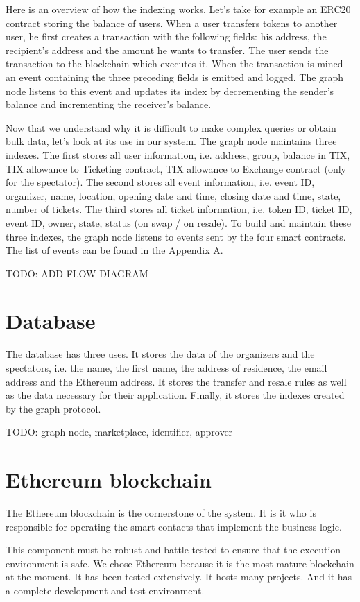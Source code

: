 \documentclass[a4paper,11pt,oneside]{report}
\begin{document}
Here is an overview of how the indexing works. Let's take for example an ERC20 contract storing the balance of users. When a user transfers tokens to another user, he first creates a transaction with the following fields: his address, the recipient's address and the amount he wants to transfer. The user sends the transaction to the blockchain which executes it. When the transaction is mined an event containing the three preceding fields is emitted and logged. The graph node listens to this event and updates its index by decrementing the sender's balance and incrementing the receiver's balance.

Now that we understand why it is difficult to make complex queries or obtain bulk data, let's look at its use in our system. The graph node maintains three indexes. The first stores all user information, i.e. address, group, balance in TIX, TIX allowance to Ticketing contract, TIX allowance to Exchange contract (only for the spectator). The second stores all event information, i.e. event ID, organizer, name, location, opening date and time, closing date and time, state, number of tickets. The third stores all ticket information, i.e. token ID, ticket ID, event ID, owner, state, status (on swap / on resale). To build and maintain these three indexes, the graph node listens to events sent by the four smart contracts. The list of events can be found in the \hyperref[sec:appendix_a]{Appendix A}.

TODO: ADD FLOW DIAGRAM

\section{Database}
The database has three uses. It stores the data of the organizers and the spectators, i.e. the name, the first name, the address of residence, the email address and the Ethereum address. It stores the transfer and resale rules as well as the data necessary for their application. Finally, it stores the indexes created by the graph protocol.

TODO: graph node, marketplace, identifier, approver

\section{Ethereum blockchain}
The Ethereum blockchain is the cornerstone of the system. It is it who is responsible for operating the smart contacts that implement the business logic.

This component must be robust and battle tested to ensure that the execution environment is safe. We chose Ethereum because it is the most mature blockchain at the moment. It has been tested extensively. It hosts many projects. And it has a complete development and test environment.
\end{document}
